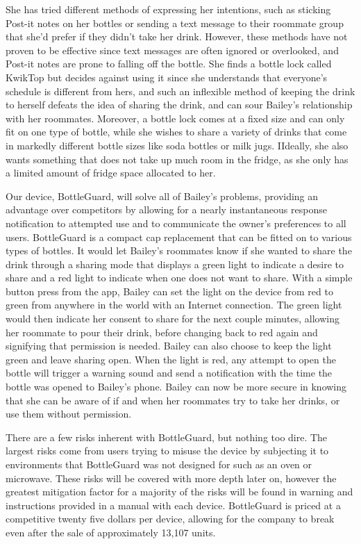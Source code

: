 \documentclass[12pt]{article}
\begin{document}
	She has tried different methods of expressing her intentions, such as sticking Post-it notes on her bottles or sending a text message to their roommate group that she'd prefer if they didn't take her drink. However, these methods have not proven to be effective since text messages are often ignored or overlooked, and Post-it notes are prone to falling off the bottle. She finds a bottle lock called KwikTop but decides against using it since she understands that everyone’s schedule is different from hers, and such an inflexible method of keeping the drink to herself defeats the idea of sharing the drink, and can sour Bailey’s relationship with her roommates. Moreover, a bottle lock comes at a fixed size and can only fit on one type of bottle, while she wishes to share a variety of drinks that come in markedly different bottle sizes like soda bottles or milk jugs. IIdeally, she also wants something that does not take up much room in the fridge, as she only has a limited amount of fridge space allocated to her.
	
	Our device, BottleGuard, will solve all of Bailey’s problems, providing an advantage over competitors by allowing for a nearly instantaneous response notification to attempted use and to communicate the owner’s preferences to all users. BottleGuard is a compact cap replacement that can be fitted on to various types of bottles. It would let Bailey’s roommates know if she wanted to share the drink through a sharing mode that displays a green light to indicate a desire to share and a red light to indicate when one does not want to share. With a simple button press from the app, Bailey can set the light on the device from red to green from anywhere in the world with an Internet connection. The green light would then indicate her consent to share for the next couple minutes, allowing her roommate to pour their drink, before changing back to red again and signifying that permission is needed.  Bailey can also choose to keep the light green and leave sharing open. When the light is red, any attempt to open the bottle will trigger a warning sound and send a notification with the time the bottle was opened to Bailey’s phone. Bailey can now be more secure in knowing that she can be aware of if and when her roommates try to take her drinks, or use them without permission.
	
	There are a few risks inherent with BottleGuard, but nothing too dire.  The largest risks come from users trying to misuse the device by subjecting it to environments that BottleGuard was not designed for such as an oven or microwave.  These risks will be covered with more depth later on, however the greatest mitigation factor for a majority of the risks will be found in warning and instructions provided in a manual with each device.  BottleGuard is priced at a competitive twenty five dollars per device, allowing for the company to break even after the sale of approximately 13,107 units.  
	
\end{document}
